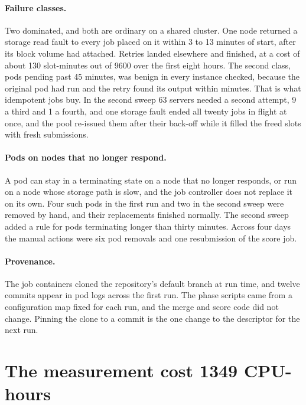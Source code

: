 \documentclass[sigconf, nonacm]{acmart}
\begin{document}
\paragraph{Failure classes.} Two dominated, and both are ordinary on a shared cluster. One node
returned a storage read fault to every job placed on it within 3 to 13 minutes of start,
after its block volume had attached. Retries landed elsewhere and finished, at a cost of about 130
slot-minutes out of 9600 over the first eight hours. The second class, pods pending past 45
minutes, was benign in every instance checked, because the original pod had run and the retry
found its output within minutes. That is what idempotent jobs buy. In the second sweep 63 servers
needed a second attempt, 9 a third and 1 a fourth, and one storage fault ended all twenty jobs in
flight at once, and the pool re-issued them after their back-off while it filled the freed slots
with fresh submissions.

\paragraph{Pods on nodes that no longer respond.} A pod can stay in a terminating state on a node that
no longer responds, or run on a node whose storage path is slow, and the job controller does
not replace it on its own. Four such pods in the first run and two in the second sweep were
removed by hand, and their replacements finished normally. The second sweep added a rule
for pods terminating longer than thirty minutes. Across four days the manual actions were six
pod removals and one resubmission of the score job.

\paragraph{Provenance.} The job containers cloned the repository's default branch at run time,
and twelve commits appear in pod logs across the first run. The phase scripts came from a
configuration map fixed for each run, and the merge and score code did not change. Pinning the
clone to a commit is the one change to the descriptor for the next run.

\section{The measurement cost 1349 CPU-hours}
\label{sec:cost}
\end{document}
